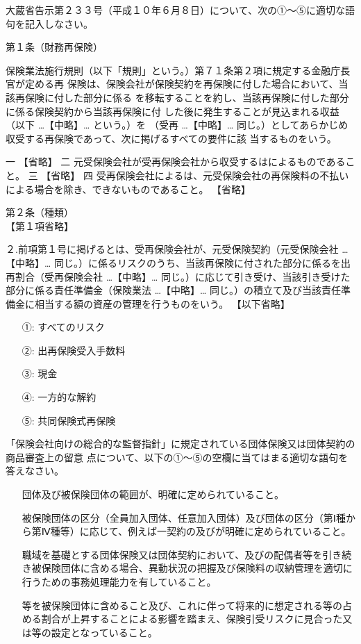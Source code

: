 \documentclass[report,gutter=10mm,fore-edge=10mm,uplatex,dvipdfmx]{jlreq}
\begin{document}
大蔵省告示第２３３号（平成１０年６月８日）について、次の①～⑤に適切な語句を記入しなさい。

第１条（財務再保険）

保険業法施行規則（以下「規則」という。）第７１条第２項に規定する金融庁長官が定める再
保険は、保険会社が保険契約を再保険に付した場合において、当該再保険に付した部分に係る
を移転することを約し、当該再保険に付した部分に係る保険契約から当該再保険に付
した後に発生することが見込まれる収益（以下 …【中略】… という。）を
（受再 …【中略】… 同じ。）としてあらかじめ収受する再保険であって、次に掲げるすべての要件に該
当するものをいう。

一 【省略】
二 元受保険会社が受再保険会社から収受するはによるものであること。
三 【省略】
四 受再保険会社によるは、元受保険会社の再保険料の不払いによる場合を除き、できないものであること。
【省略】

第２条（種類）\\
【第１項省略】

２.前項第１号に掲げるとは、受再保険会社が、元受保険契約（元受保険会社 …【中略】… 同じ。）に係るリスクのうち、当該再保険に付された部分に係るを出再割合（受再保険会社 …【中略】… 同じ。）に応じて引き受け、当該引き受けた部分に係る責任準備金（保険業法 …【中略】… 同じ。）の積立て及び当該責任準備金に相当する額の資産の管理を行うものをいう。
【以下省略】

\answer{}
\begin{itemize}
\item[ ①: ]  すべてのリスク
\item[ ②: ]  出再保険受入手数料
\item[ ③: ]  現金
\item[ ④: ]  一方的な解約
\item[ ⑤: ]  共同保険式再保険
\end{itemize}


「保険会社向けの総合的な監督指針」に規定されている団体保険又は団体契約の商品審査上の留意
点について、以下の①～⑤の空欄に当てはまる適切な語句を答えなさい。

\begin{itemize}
\item[] 団体及び被保険団体の範囲が、明確に定められていること。
\item[] 被保険団体の区分（全員加入団体、任意加入団体）及び団体の区分（第Ⅰ種から第Ⅳ種等）に応じて、例えば一契約の及びが明確に定められていること。
\item[] 職域を基礎とする団体保険又は団体契約において、及びの配偶者等を引き続き被保険団体に含める場合、異動状況の把握及び保険料の収納管理を適切に行うための事務処理能力を有していること。
\item[]  等を被保険団体に含めること及び、これに伴って将来的に想定される等の占める割合が上昇することによる影響を踏まえ、保険引受リスクに見合った又は等の設定となっていること。
\end{itemize}
\end{document}
